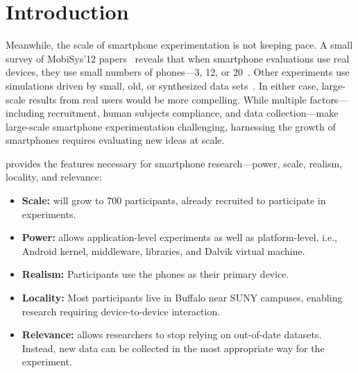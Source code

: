 \section{Introduction}
\label{sec-introduction}


Meanwhile, the scale of smartphone experimentation is not keeping pace. A
small survey of MobiSys'12 papers~ reveals that when smartphone evaluations use real
devices, they use small numbers of phones---3, 12, or
20~\cite{nowar-mobisys12,comon-mobisys12,caching-mobisys12}. Other
experiments use simulations driven by small, old, or synthesized data
sets~\cite{falcon-mobisys12,ace-mobisys12,humanmobility-mobisys12}. In either
case, large-scale results from real users would be more compelling. While
multiple factors---including recruitment, human subjects compliance, and data
collection---make large-scale smartphone experimentation challenging,
harnessing the growth of smartphones requires evaluating new ideas at scale.

\PhoneLab{} provides the features necessary for smartphone research---power,
scale, realism, locality, and relevance:

\begin{itemize}[nosep,leftmargin=*]
\vspace*{0.08in}
\item {\bf Scale:} \PhoneLab{} will grow to 700 participants, already
recruited to participate in experiments.
\item {\bf Power:} \PhoneLab{} allows application-level experiments as well
as platform-level, i.e., Android kernel, middleware, libraries, and Dalvik
virtual machine.
\item {\bf Realism:} Participants use the phones as their primary device.
\item {\bf Locality:} Most participants live in Buffalo near SUNY campuses,
enabling research requiring device-to-device interaction.
\item {\bf Relevance:} \PhoneLab{} allows researchers to stop relying on
out-of-date datasets. Instead, new data can be collected in the most
appropriate way for the experiment.
\vspace*{0.08in}
\end{itemize}


